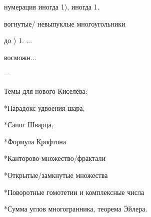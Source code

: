 

















нумерация иногда 1), иногда 1.




вогнутые/ невыпуклые многоугольники 

\smallskip до ) 1. ...












восможн...

---

Темы для нового Киселёва:

*Парадокс удвоения шара,

*Сапог Шварца,

*Формула Крофтона

*Канторово множество/фрактали

*Открытые/замкнутые множества

*Поворотные гомотетии и комплексные числа

*Сумма углов многогранника, теорема Эйлера. 
